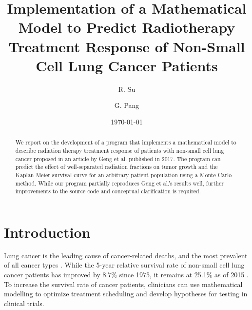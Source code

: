 \documentclass[letterpaper
, superscriptaddress
, twocolumn
, aps
]{revtex4}
\begin{document}
\title{Implementation of a Mathematical Model to Predict Radiotherapy Treatment Response of Non-Small Cell Lung Cancer Patients}

\author{R. Su}

\author{G. Pang}

\date{\today}

\begin{abstract}
We report on the development of a program that implements a mathematical model to describe radiation therapy treatment response of patients with non-small cell lung cancer proposed in an article by Geng et al. published in 2017. The program can predict the effect of well-separated radiation fractions on tumor growth and the Kaplan-Meier survival curve for an arbitrary patient population using a Monte Carlo method. While our program partially reproduces Geng et al.'s results well, further improvements to the source code and conceptual clarification is required.
\end{abstract}

\keywords{}

\maketitle

\section{Introduction}
Lung cancer is the leading cause of cancer-related deaths, and the most prevalent of all cancer types \cite{Bray2018}. While the 5-year relative survival rate of non-small cell lung cancer patients has improved by 8.7\% since 1975, it remains at 25.1\% as of 2015 \cite{Howlader19752016.November2018.April2019}. To increase the survival rate of cancer patients, clinicians can use mathematical modelling to optimize treatment scheduling and develop hypotheses for testing in clinical trials. 
\end{document}
